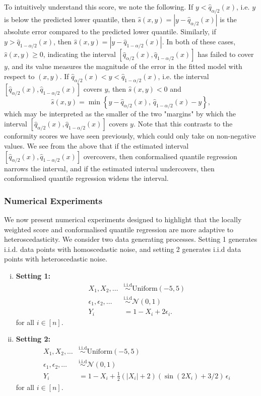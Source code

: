 \documentclass[11pt, titlepage]{article} %
\newcommand{\R}{\mathrm}
\numberwithin{equation}{section}
\theoremstyle{definition}
\numberwithin{theorem}{section}
\numberwithin{lemma}{section}
\numberwithin{corollary}{section}
\numberwithin{proposition}{section}
\numberwithin{definition}{section}
\numberwithin{remark}{section}
\begin{document}
\noindent
To intuitively understand this score, we note the following. If \(y < \hat{q}_{\alpha/2}(x)\), i.e. \(y\) is below the predicted lower quantile, then \(\hat{s}(x,y) = |y - \hat{q}_{\alpha/2}(x)|\) is the absolute error compared to the predicted lower quantile. Similarly, if \(y > \hat{q}_{1-\alpha/2}(x)\), then \(\hat{s}(x,y) = |y - \hat{q}_{1-\alpha/2}(x)|.\) In both of these cases, \(\hat{s}(x,y) \geq 0\), indicating the interval \([\hat{q}_{\alpha/2}(x), \hat{q}_{1-\alpha/2}(x)]\) has failed to cover \(y\), and its value measures the magnitude of the error in the fitted model with respect to \((x,y)\). If \(\hat{q}_{\alpha/2}(x) < y < \hat{q}_{1-\alpha/2}(x)\), i.e. the interval \([\hat{q}_{\alpha/2}(x), \hat{q}_{1-\alpha/2}(x)]\) covers \(y\), then \(\hat{s}(x,y) < 0\) and \[\hat{s}(x,y) = \min \left\{ y - \hat{q}_{\alpha/2}(x), \, \hat{q}_{1-\alpha/2}(x) - y \right\},\] which may be interpreted as the smaller of the two "margins" by which the interval \([\hat{q}_{\alpha/2}(x), \hat{q}_{1-\alpha/2}(x)]\) covers \(y\). Note that this contrasts to the conformity scores we have seen previously, which could only take on non-negative values. We see from the above that if the estimated interval \([\hat{q}_{\alpha/2}(x), \hat{q}_{1-\alpha/2}(x)]\) overcovers, then conformalised quantile regression narrows the interval, and if the estimated interval undercovers, then conformalised quantile regression widens the interval.

\subsubsection{Numerical Experiments}

We now present numerical experiments designed to highlight that the locally weighted score and conformalised quantile regression are more adaptive to heteroscedasticity. We consider two data generating processes. Setting 1 generates i.i.d. data points with homoscedastic noise, and setting 2 generates i.i.d data points with heteroscedastic noise.
\begin{enumerate}[(i)]
    \item \textbf{Setting 1: } \begin{align*}
        X_1, X_2, \ldots &\overset{\R{i.i.d}}{\sim} \R{Uniform}(-5,5) \\
        \epsilon_1, \epsilon_2, \ldots &\overset{\R{i.i.d}}{\sim} \mathcal{N}(0,1) \\
        Y_i &= 1 - X_i + 2\epsilon_i. 
    \end{align*} for all \(i \in [n]\).
    \item \textbf{Setting 2: } \begin{align*}
        X_1, X_2, \ldots &\overset{\R{i.i.d}}{\sim} \R{Uniform}(-5,5) \\
        \epsilon_1, \epsilon_2, \ldots &\overset{\R{i.i.d}}{\sim} \mathcal{N}(0,1) \\
        Y_i &= 1 - X_i + \frac{1}{2}(|X_i| + 2)(\sin(2X_i) + 3/2) \, \epsilon_i
    \end{align*} for all \(i \in [n]\).    
\end{enumerate}
\end{document}
